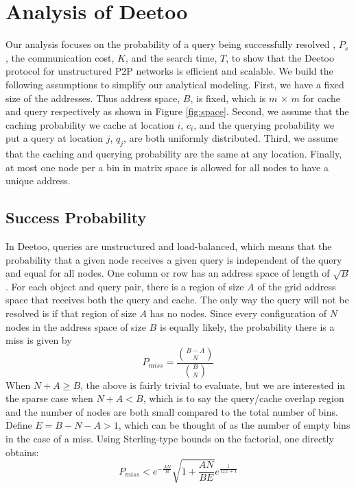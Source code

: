 \documentclass[conference]{IEEEtran}
\begin{document}
\section{Analysis of Deetoo}\label{sec:analysis}
Our analysis focuses on the probability of a query being successfully resolved
, $P_{s}$, the communication cost, $K$, and the search time, $T$,
to show that the Deetoo protocol for unstructured P2P
networks is efficient and scalable. We build the following assumptions to 
simplify our analytical modeling.
First, we have a fixed size of the addresses. Thus
address space, $B$, is fixed, which is $m$ $\times$
$m$ for cache and query respectively as shown in
Figure \ref{fig:space}. Second, we assume that the caching probability we
cache at location $i$, $c_{i}$, and the querying
probability we put a query at location $j$, $q_{j}$, are both
uniformly distributed. Third, we assume that the caching and querying
probability are the same at any location. Finally, at most one node per
a bin in matrix space is allowed for all nodes to have a unique
address.


\subsection{Success Probability}
\label{sec:suc_prob}
In Deetoo, queries are unstructured and load-balanced, which means
that the probability that a given node receives a given query is independent
of the query and equal for all nodes.
One column or row has an address space of length of $\sqrt{B}$. 
For each object and query pair, there
is a region of size $A$ of the grid address space that receives both the query
and cache.  The only way the query will not be resolved is if that region of
size $A$ has no nodes.  Since every configuration of $N$ nodes in the address
space of size $B$ is equally likely, the probability there is a miss is given
by
\[
P_{miss}=\frac{{{B-A}\choose N }}{{B \choose N}}
\]
When $N+A\ge B$, the above is fairly trivial to evaluate, but we are
interested in the sparse case when $N+A<B$, which is to say the query/cache
overlap region and the number of nodes are both small compared to the total
number of bins.  Define $E=B-N-A>1$, which can be thought of as the number of
empty bins in the case of a miss.
Using Sterling-type bounds on the factorial, one directly obtains:
\[
P_{miss} < e^{-\frac{AN}{B}}\sqrt{1+\frac{AN}{BE}}e^{\frac{1}{12E+1}}
\]
\end{document}
